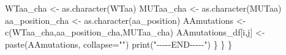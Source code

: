 \documentclass[
]{article}
\newenvironment{Shaded}{\begin{snugshade}}{\end{snugshade}}
\newcommand{\AttributeTok}[1]{\textcolor[rgb]{0.77,0.63,0.00}{#1}}
\newcommand{\FunctionTok}[1]{\textcolor[rgb]{0.00,0.00,0.00}{#1}}
\newcommand{\NormalTok}[1]{#1}
\newcommand{\OtherTok}[1]{\textcolor[rgb]{0.56,0.35,0.01}{#1}}
\newcommand{\StringTok}[1]{\textcolor[rgb]{0.31,0.60,0.02}{#1}}
\begin{document}
\begin{Shaded}
\begin{Highlighting}[]
\NormalTok{      WTaa\_cha }\OtherTok{\textless{}{-}} \FunctionTok{as.character}\NormalTok{(WTaa)}
\NormalTok{      MUTaa\_cha }\OtherTok{\textless{}{-}} \FunctionTok{as.character}\NormalTok{(MUTaa)}
\NormalTok{      aa\_position\_cha }\OtherTok{\textless{}{-}} \FunctionTok{as.character}\NormalTok{(aa\_position)}
\NormalTok{      AAmutations }\OtherTok{\textless{}{-}} \FunctionTok{c}\NormalTok{(WTaa\_cha,aa\_position\_cha,MUTaa\_cha)}
\NormalTok{      AAmutations\_df[i,j] }\OtherTok{\textless{}{-}} \FunctionTok{paste}\NormalTok{(AAmutations, }\AttributeTok{collapse=}\StringTok{""}\NormalTok{)}
      \FunctionTok{print}\NormalTok{(}\StringTok{"{-}{-}{-}{-}{-}END{-}{-}{-}{-}{-}"}\NormalTok{)}
\NormalTok{    \}}
\NormalTok{  \}}
\NormalTok{\}}
\end{Highlighting}
\end{Shaded}
\end{document}
